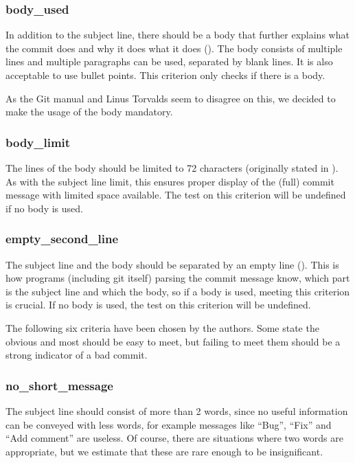 \subsubsection{body\_used}
\label{subs:body_used}
In addition to the subject line, there should be a body that further explains what the commit does and why it does what it does (\cite{OffGuide}). The body consists of multiple lines and multiple paragraphs can be used, separated by blank lines. It is also acceptable to use bullet points. This criterion only checks if there is a body.

As the Git manual \cite{OffGuide} and Linus Torvalds \cite{SR} seem to disagree on this, we decided to make the usage of the body mandatory.

\subsubsection{body\_limit}
\label{subs:body_limit}
The lines of the body should be limited to 72 characters (originally stated in \cite{TP}). As with the subject line limit, this ensures proper display of the (full) commit message with limited space available. The test on this criterion will be undefined if no body is used.

\subsubsection{empty\_second\_line}
\label{subs:empty_second_line}
The subject line and the body should be separated by an empty line (\cite{TP}). This is how programs (including git itself) parsing the commit message know, which part is the subject line and which the body, so if a body is used, meeting this criterion is crucial. If no body is used, the test on this criterion will be undefined.

\par\bigskip
The following six criteria have been chosen by the authors. Some state the obvious and most should be easy to meet, but failing to meet them should be a strong indicator of a bad commit.

\subsubsection{no\_short\_message}
\label{subs:no_short_message}
The subject line should consist of more than 2 words, since no useful information can be conveyed with less words, for example messages like ``Bug'', ``Fix'' and ``Add comment'' are useless. Of course, there are situations where two words are appropriate, but we estimate that these are rare enough to be insignificant.

